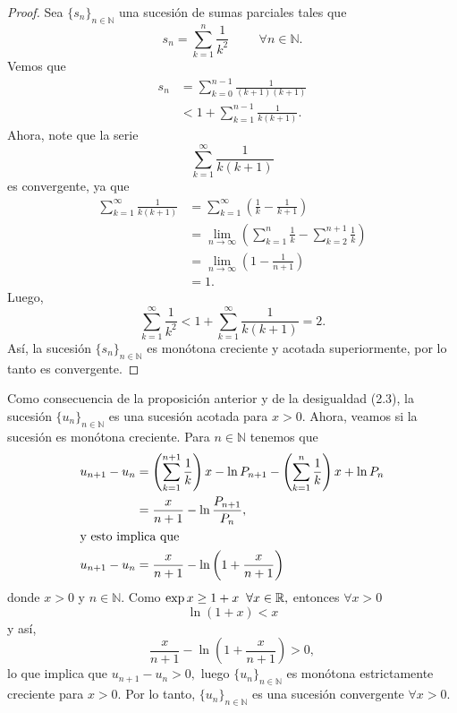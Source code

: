 \begin{proof}
	Sea $\{s_n\}_{n \in \mathbb{N}}$ una sucesión de sumas parciales tales que $$s_n = \sum_{k = 1}^{n}\frac{1}{k^2}\hspace{1cm}\forall n \in \mathbb{N}.$$ Vemos que
	\begin{align*}
	s_n &= \sum_{k = 0}^{n-1}\frac{1}{(k+1)(k+1)}\\
	&< 1+\sum_{k = 1}^{n-1}\frac{1}{k(k+1)}.
	\end{align*}
	Ahora, note que la serie $$\sum_{k = 1}^{\infty}\frac{1}{k(k+1)}$$ es convergente, ya que
	\begin{align*}
	\sum_{k = 1}^{\infty}\frac{1}{k(k+1)} &= \sum_{k = 1}^{\infty}\left(\frac{1}{k}-\frac{1}{k+1}\right)\\
	&= \lim_{n \rightarrow \infty}\left(\sum_{k = 1}^{n}\frac{1}{k}-\sum_{k = 2}^{n+1}\frac{1}{k}\right)\\
	&= \lim_{n\rightarrow\infty}\left(1-\frac{1}{n+1}\right)\\
	&= 1.
	\end{align*}
	Luego, $$\sum_{k = 1}^{\infty}\frac{1}{k^2} < 1+\sum_{k = 1}^{\infty}\frac{1}{k(k+1)} = 2.$$ Así, la sucesión $\{s_n\}_{n \in \mathbb{N}}$ es monótona creciente y acotada superiormente, por lo tanto es convergente.
\end{proof}
Como consecuencia de la proposición anterior y de la desigualdad (2.3), la sucesión $\{u_n\}_{n \in \mathbb{N}}$ es una sucesión acotada para $x > 0.$ Ahora, veamos si la sucesión es monótona creciente. Para $n \in \mathbb{N}$ tenemos que
\begin{align*}
u_{n+1}-u_n &= \left(\sum_{k = 1}^{n+1}\frac{1}{k}\right)x-\ln P_{n+1}-\left(\sum_{k = 1}^{n}\frac{1}{k}\right)x+\ln P_n\\
&= \frac{x}{n+1}-\ln \frac{P_{n+1}}{P_n},\\
\intertext{y esto implica que}
u_{n+1}-u_n &= \frac{x}{n+1}-\ln \left(1+\frac{x}{n+1}\right)
\end{align*} 
donde $x > 0$ y $n \in \mathbb{N}.$
Como $\exp x \geq 1+x\hspace{0.2cm} \forall x \in \mathbb{R},$ entonces $\forall x>0$ $$\ln (1+x) < x$$ y así, $$\frac{x}{n+1}-\ln \left(1+\frac{x}{n+1}\right) > 0,$$ lo que implica que $u_{n+1}-u_n > 0,$ luego $\{u_n\}_{n \in \mathbb{N}}$ es monótona estrictamente creciente para $x > 0.$ Por lo tanto, $\{u_n\}_{n \in \mathbb{N}}$ es una sucesión convergente $\forall x > 0.$

